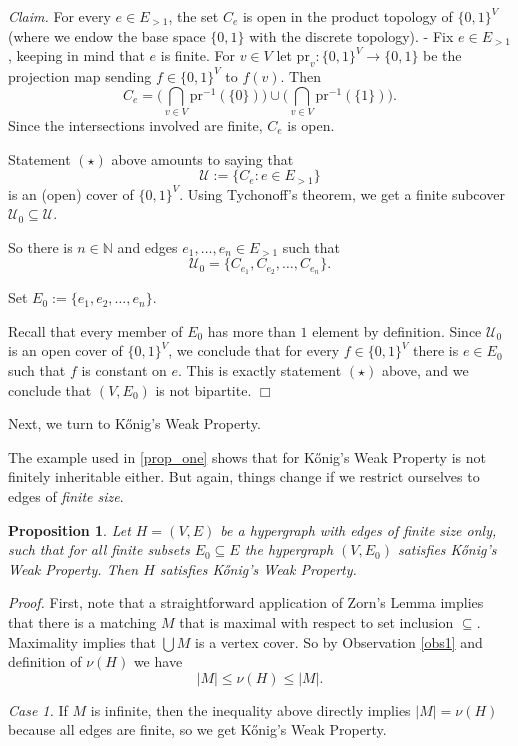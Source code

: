 \documentclass[12pt]{amsart}
\newtheorem{proposition}[lemma]{\bf Proposition}
\newcommand{\proofend}{{\hfill $\Box$}}
\begin{document}
{\it Claim.} For every $e\in E_{>1}$, the set $C_e$ is open in the product 
topology of $\{0,1\}^V$ (where we endow the base space $\{0,1\}$ with the 
discrete topology). - Fix $e\in E_{>1}$, keeping in mind that $e$ is finite.
For $v\in V$ let $\text{pr}_v: \{0,1\}^V\to \{0,1\}$ be the projection
map sending $f\in \{0,1\}^V$ to $f(v)$.
Then $$C_e = \Big(\bigcap_{v\in V}\text{pr}^{-1}(\{0\})\Big) \cup 
\Big(\bigcap_{v\in V}\text{pr}^{-1}(\{1\})\Big).$$ Since
the intersections involved are finite, $C_e$ is open.

Statement $(\star)$ above amounts to saying that 
$${\mathcal U} := \big\{C_e: e\in E_{>1}\big\}$$
is an (open) cover of $\{0,1\}^V$. Using Tychonoff's theorem, we get a
finite subcover ${\mathcal U}_0\subseteq {\mathcal U}$. 

So there is $n\in\mathbb{N}$ and edges $e_1, \ldots, e_n\in E_{>1}$
such that $${\mathcal U}_0=\{C_{e_1}, C_{e_2},\ldots,C_{e_n}\}.$$

Set $E_0 := \{e_1, e_2,\ldots, e_n\}$.

Recall that every member of $E_0$ has more than $1$ element by definition.
Since ${\mathcal U}_0$ is an open cover of $\{0,1\}^V$, we conclude that 
for every $f\in \{0,1\}^V$ there is $e \in E_0$ such that $f$ is constant
on $e$. This is exactly statement $(\star)$ above, and we conclude
that $(V,E_0)$ is not bipartite. \proofend

Next, we turn to K\H{o}nig's Weak Property.

The example used in \ref{prop_one} shows that for K\H{o}nig's Weak Property is not
finitely inheritable either. But again, things change if we restrict ourselves to 
edges of {\sl finite size}.

\begin{proposition}
Let $H= (V,E)$  be a hypergraph with edges of finite size only, such that for 
all finite subsets $E_0\subseteq E$ the hypergraph $(V, E_0)$ satisfies
K\H{o}nig's Weak Property. Then $H$ satisfies K\H{o}nig's Weak Property.
\end{proposition}

{\em Proof.} First, note that a straightforward application
of Zorn's Lemma implies that there is a matching $M$ that
is maximal with respect to set inclusion $\subseteq$. 
Maximality implies that $\bigcup M$ is a vertex cover. 
So by Observation \ref{obs1} and
definition of $\nu(H)$ we have $$|M| \leq \nu(H) \leq |M|.$$

{\em Case 1.} If $M$ is infinite, then the inequality above
directly implies $|M| = \nu(H)$ because all edges are finite,
so we get K\H{o}nig's Weak Property.
\end{document}
